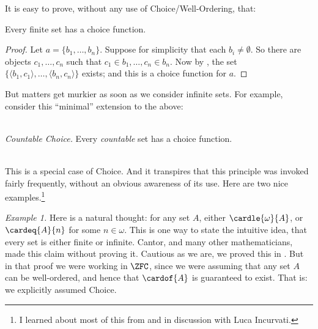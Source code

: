 \documentclass[../../../include/open-logic-section]{subfiles}
\begin{document}
It is easy to prove, without any use of Choice/Well-Ordering, that:
\begin{lem}[in $\Zminus$]
	Every {finite} set has a choice function. 
\end{lem}
\begin{proof}
	Let $a = \{b_1, \ldots, b_n\}$. Suppose for simplicity that each $b_i \neq \emptyset$. So there are objects $c_1, \ldots, c_n$ such that $c_1 \in b_1, \ldots, c_n \in b_n$. Now by , the set $\{\langle b_1, c_1\rangle , \ldots, \langle b_n, c_n\rangle\}$ exists; and this is a choice function for $a$.
\end{proof}\noindent
But matters get murkier as soon as we consider infinite sets. For example, consider this ``minimal'' extension to the above:

\
\\\emph{Countable Choice.} Every \emph{countable} set has a choice function. 

\
\\
This is a special case of Choice. And it transpires that this principle was invoked fairly frequently, without  an obvious awareness of its use. Here are two nice examples.\footnote{I learned about most of this from \citet[\S9.4]{Potter2004} and in discussion with Luca Incurvati.}

\emph{Example 1.} 
Here is a natural thought: for any set $A$, either $\cardle{\omega}{A}$, or $\cardeq{A}{n}$ for some $n \in \omega$. This is one way to state the intuitive idea, that every set is either finite or infinite. Cantor, and many other mathematicians, made this claim without proving it. Cautious as we are, we proved this in . But in that proof we were working in $\ZFC$, since we were assuming that any set $A$ can be well-ordered, and hence that $\cardof{A}$ is guaranteed to exist. That is: we explicitly assumed Choice.
\end{document}

